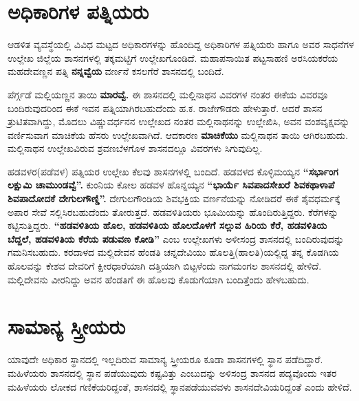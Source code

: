 \section*{ಅಧಿಕಾರಿಗಳ ಪತ್ನಿಯರು}

ಆಡಳಿತ ವ್ಯವಸ್ಥೆಯಲ್ಲಿ ವಿವಿಧ ಮಟ್ಟದ ಅಧಿಕಾರಗಳನ್ನು ಹೊಂದಿದ್ದ ಅಧಿಕಾರಿಗಳ ಪತ್ನಿಯರು ಹಾಗೂ ಅವರ ಸಾಧನೆಗಳ ಉಲ್ಲೇಖ ಜಿಲ್ಲೆಯ ಶಾಸನಗಳಲ್ಲಿ ತಕ್ಕಮಟ್ಟಿಗೆ ಉಲ್ಲೇಖಗೊಂಡಿದೆ. ಮಹಾಪಸಾಯಿತ ಪಟ್ಟಸಾಹಣಿ ಅರಸಿಯಕರೆಯ ಮಹದೇವಣ್ಣನ ಪತ್ನಿ \textbf{ನನ್ನವ್ವೆಯ} ವರ್ಣನೆ ಕಸಲಗೆರೆ ಶಾಸನದಲ್ಲಿ ಬಂದಿದೆ.

ಪೆರ್ಗ್ಗಡೆ ಮಲ್ಲಿಯಣ್ಣನ ತಾಯಿ \textbf{ಮಾರವ್ವೆ.} ಈ ಶಾಸನದಲ್ಲಿ ಮಲ್ಲಿನಾಥನ ವಿವರಗಳ ನಂತರ ಈಕೆಯ ವಿವರವೂ ಬಂದಿರುವುದರಿಂದ ಈಕೆ ಇವನ ಪತ್ನಿಯಾಗಿರಬಹುದೆಂದು ಹ.ಕ. ರಾಜೇಗೌಡರು ಹೇಳುತ್ತಾರೆ. ಆದರೆ ಶಾಸನ ತ್ರುಟಿತವಾಗಿದ್ದು, ಮೊದಲು ವಿಷ್ಣುವರ್ಧನನ ಉಲ್ಲೇಖದ ನಂತರ ಮಲ್ಲಿನಾಥನನ್ನು ಉಲ್ಲೇಖಿಸಿ, ಅವನ ವಂಶವೃಕ್ಷವನ್ನು ವರ್ಣಿಸುವಾಗ ಮಾಚಿಕೆಯ ಹೆಸರು ಉಲ್ಲೇಖವಾಗಿದೆ. ಆದಕಾರಣ \textbf{ಮಾಚಿಕೆಯು} ಮಲ್ಲಿನಾಥನ ತಾಯಿ ಆಗಿರಬಹುದು. ಮಲ್ಲಿನಾಥನ ಉಲ್ಲೇಖವಿರುವ ಶ್ರವಣಬೆಳಗೊಳ ಶಾಸನದಲ್ಲೂ ವಿವರಗಳು ಸಿಗುವುದಿಲ್ಲ.

ಹಡವಳರ(ಪಡೆವಳ) ಪತ್ನಿಯರ ಉಲ್ಲೇಖ ಕೆಲವು ಶಾಸನಗಳಲ್ಲಿ ಬಂದಿದೆ. ಹಡವಳದ ಕೊಳ್ಳಿಮಯ್ಯನ \textbf{“ಸರ್ಭಾಂಗ ಲಕ್ಷುಮಿ ಚಾಮುಂಡವ್ವೆ”.} ಕುಂನಿಯ ಕೋಲ ಹಡವಳ ಹೊನ್ನಯ್ಯನ \textbf{“ಭಾರ್ಯೆ ಸಿವಪಾದಸೇಖರೆ ಶಿವಕಥಾಳಾಪೆ ಶಿವಪಾದೋದಕೆ ದೇಗುಲಗೌಣ್ಡಿ”.} ದೇಗುಲಗೌಂಡಿಯ ಶಿವಭಕ್ತಿಯ ವರ್ಣನೆಯನ್ನು ನೋಡಿದರೆ ಈಕೆ ಶೈವಧರ್ಮಕ್ಕೆ ಅಪಾರ ಸೇವೆ ಸಲ್ಲಿಸಿರಬಹುದೆಂದು ತೋರುತ್ತದೆ. ಹಡವಳಿತಿಯರು ಭೂಮಿಯನ್ನು ಹೊಂದಿರುತ್ತಿದ್ದರು. ಕೆರೆಗಳನ್ನು ಕಟ್ಟಿಸುತ್ತಿದ್ದರು. \textbf{“ಹಡವಳಿತಿಯ ಹೊಲ, ಹಡವಳಿತಿಯ ಹೊಲದೊಳಗೆ ಸಲ್ಲುವ ಹಿರಿಯ ಕೆರೆ, ಹಡವಳಿತಿಯ ಬೆದ್ದಲೆ, ಹಡವಳಿತಿಯ ಕೆರೆಯ ಪಡುವಣ ಕೋಡಿ”} ಎಂಬ ಉಲ್ಲೇಖಗಳು ಅಳೀಸಂದ್ರ ಶಾಸನದಲ್ಲಿ ಬಂದಿರುವುದನ್ನು ಗಮನಿಸಬಹುದು. ಕರದಾಳದ ಮಲ್ಲಿದೇವನ ಹೆಂಡತಿ ಚನ್ನದೇವಿಯು ಹೊಲತ್ತಿ(ಹಾಲತಿ)ಯಲ್ಲಿದ್ದ ತನ್ನ ಕೊಡಗಿಯ ಹೊಲವನ್ನು ಕೇಶವ ದೇವರಿಗೆ ಕ್ಷೀರಧಾರೆಯಾಗಿ ದತ್ತಿಯಾಗಿ ಬಿಟ್ಟಳೆಂದು ನಾಗಮಂಗಲ ಶಾಸನದಲ್ಲಿ ಹೇಳಿದೆ. ಮಲ್ಲಿದೇವನು ವೀರನಿದ್ದು ಅವನ ಹೆಂಡತಿಗೆ ಈ ಹೊಲವು ಕೊಡುಗೆಯಾಗಿ ಬಂದಿತ್ತೆಂದು ಹೇಳಬಹುದು.

\section*{ಸಾಮಾನ್ಯ ಸ್ತ್ರೀಯರು}

ಯಾವುದೇ ಅಧಿಕಾರ ಸ್ಥಾನದಲ್ಲಿ ಇಲ್ಲದಿರುವ ಸಾಮಾನ್ಯ ಸ್ತ್ರೀಯರೂ ಕೂಡಾ ಶಾಸನಗಳಲ್ಲಿ ಸ್ಥಾನ ಪಡೆದಿದ್ದಾರೆ. ಮಹಿಳೆಯರು ಶಾಸನದಲ್ಲಿ ಸ್ಥಾನ ಪಡೆಯುವುದು ಕಷ್ಟವಿತ್ತು ಎಂಬುದನ್ನು ಅಳಿಸಂದ್ರ ಶಾಸನದ ಪದ್ಯವೊಂದು ಇತರ ಮಹಿಳೆಯರು ಲೋಕದ ಗಣಿಕೆಯರಿದ್ದಂತೆ, ಶಾಸನದಲ್ಲಿ ಸ್ಥಾನಪಡೆಯುವವಳು ಶಾಸನದೇವಿಯರಿದ್ದಂತೆ ಎಂದು ಹೇಳಿದೆ.

